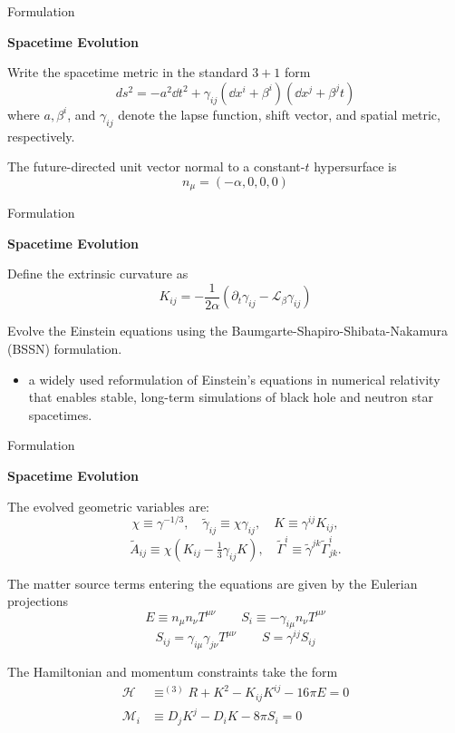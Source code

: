 \documentclass[aspectratio=169, 12pt]{beamer}
\begin{document}
\begin{frame}{Formulation}
	\begin{center}
	{\large\bfseries Spacetime Evolution}
	\end{center}
	
	Write the spacetime metric in the standard $3+1$ form
	\begin{equation}
		\label{eq:metric}
		ds^2 = - a^2 \dd{t}^2 
		+ \gamma_{ij} ( \dd{x}^i + \beta^i )
		(\dd{x}^j + \beta^{j} t)
	\end{equation}
	where $a,\beta^i$, and $\gamma_{ij}$ denote the lapse function,
	shift vector, and spatial metric, respectively. 

	The future-directed unit vector normal to a constant-$t$ hypersurface
	is 
	\[
		n_\mu = (-\alpha,0,0,0)
	\]
\end{frame}


\begin{frame}{Formulation}
	\begin{center}
	{\large\bfseries Spacetime Evolution}
	\end{center}
	
	Define the extrinsic curvature as 
	\begin{equation}
		\label{eq:extrinsic-curvature}
		K_{ij} = 
		- \frac{1}{2\alpha}
		(\partial_t \gamma_{ij} - \mathcal{L}_\beta \gamma_{ij})
	\end{equation}

	Evolve the Einstein equations using the Baumgarte-Shapiro-Shibata-Nakamura
	(BSSN) formulation. 
	\begin{itemize}
	    \item a widely used reformulation of Einstein's equations in numerical relativity that enables stable, long-term simulations of black hole and neutron star spacetimes.
	\end{itemize}	

\end{frame}

\begin{frame}{Formulation}
	\begin{center}
	{\large\bfseries Spacetime Evolution}
	\end{center}
	
	The evolved geometric variables are:
	\[
		\chi \equiv \gamma^{-1/3}, \quad
		\tilde{\gamma}_{ij} \equiv \chi \gamma_{ij}, \quad
		K \equiv \gamma^{ij} K_{ij},
	\]
	\[
		\tilde{A}_{ij} \equiv \chi\left(K_{ij} - \tfrac{1}{3}\gamma_{ij}K\right),
		\quad
		\tilde{\Gamma}^i \equiv \tilde{\gamma}^{jk}\tilde{\Gamma}^i_{jk}.
	\]

	The matter source terms entering the equations are given by the Eulerian projections
	\[
		E \equiv n_\mu n_\nu T^{\mu\nu} \qquad S_i \equiv - \gamma_{i\mu} n_\nu  T^{\mu\nu}
	\]
	\[
		S_{ij} = \gamma_{i\mu} \gamma_{j\nu} T^{\mu\nu} \qquad  S = \gamma^{ij} S_{ij}
	\]

	The Hamiltonian and momentum constraints take the form
	\begin{align*}
		\mathscr{H}&\equiv ^{(3)} R + K^2 - K_{ij} K^{ij} - 16\pi E = 0 \\
		\mathscr{M}_i &\equiv D_j K^j - D_i K - 8\pi S_i = 0
	\end{align*}
\end{frame}
\end{document}
